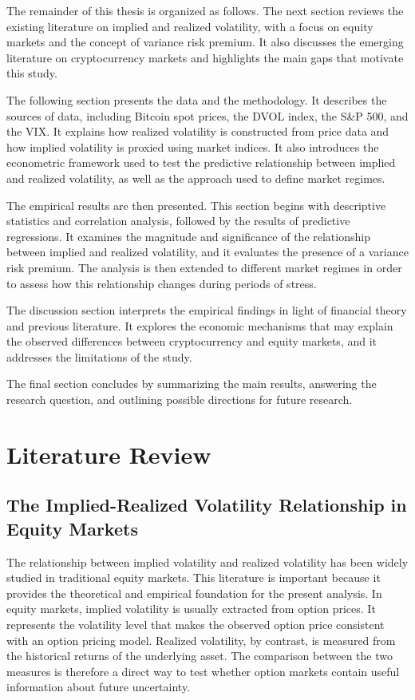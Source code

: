 \documentclass[11pt,a4paper,openany]{report}
\begin{document}
The remainder of this thesis is organized as follows. The next section
reviews the existing literature on implied and realized volatility, with
a focus on equity markets and the concept of variance risk premium. It
also discusses the emerging literature on cryptocurrency markets and
highlights the main gaps that motivate this study.

The following section presents the data and the methodology. It
describes the sources of data, including Bitcoin spot prices, the DVOL
index, the S\&P 500, and the VIX. It explains how realized volatility is
constructed from price data and how implied volatility is proxied using
market indices. It also introduces the econometric framework used to
test the predictive relationship between implied and realized
volatility, as well as the approach used to define market regimes.

The empirical results are then presented. This section begins with
descriptive statistics and correlation analysis, followed by the results
of predictive regressions. It examines the magnitude and significance of
the relationship between implied and realized volatility, and it
evaluates the presence of a variance risk premium. The analysis is then
extended to different market regimes in order to assess how this
relationship changes during periods of stress.

The discussion section interprets the empirical findings in light of
financial theory and previous literature. It explores the economic
mechanisms that may explain the observed differences between
cryptocurrency and equity markets, and it addresses the limitations of
the study.

The final section concludes by summarizing the main results, answering
the research question, and outlining possible directions for future
research.

\chapter{Literature Review}\label{literature-review}

\section{The Implied-Realized Volatility Relationship in Equity
Markets}\label{the-implied-realized-volatility-relationship-in-equity-markets}

The relationship between implied volatility and realized volatility has
been widely studied in traditional equity markets. This literature is
important because it provides the theoretical and empirical foundation
for the present analysis. In equity markets, implied volatility is
usually extracted from option prices. It represents the volatility level
that makes the observed option price consistent with an option pricing
model. Realized volatility, by contrast, is measured from the historical
returns of the underlying asset. The comparison between the two measures
is therefore a direct way to test whether option markets contain useful
information about future uncertainty.
\end{document}
